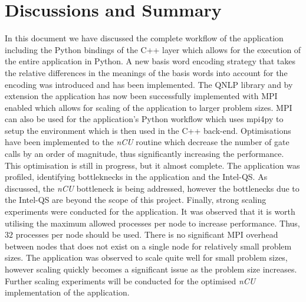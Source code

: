 \section{Discussions and Summary}
\label{sec:discussion_and_summary}

In this document we have discussed the complete workflow of the application including the Python bindings of the C++ layer which allows for the execution of the entire application in Python. A new basis word encoding strategy that takes the relative differences in the meanings of the basis words into account for the encoding was introduced and has been implemented. The QNLP library and by extension the application has now been successfully implemented with MPI enabled which allows for scaling of the application to larger problem sizes. MPI can also be used for the application's Python workflow which uses mpi4py to setup the environment which is then used in the C++ back-end. Optimisations have been implemented to the \textit{nCU} routine which decrease the number of gate calls by an order of magnitude, thus significantly increasing the performance. This optimisation is still in progress, but it almost complete. The application was profiled, identifying bottleknecks in the application and the Intel\textregistered-QS. As discussed, the \textit{nCU} bottleneck is being addressed, however the bottlenecks due to the Intel\textregistered-QS are beyond the scope of this project. Finally, strong scaling experiments were conducted for the application. It was observed that it is worth utilising the maximum allowed processes per node to increase performance. Thus, $32$ processes per node should be used. There is no significant MPI overhead between nodes that does not exist on a single node for relatively small problem sizes. The application was observed to scale quite well for small problem sizes, however scaling quickly becomes a significant issue as the problem size increases. Further scaling experiments will be conducted for the optimised \textit{nCU} implementation of the application.